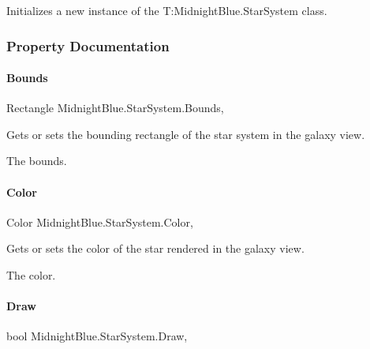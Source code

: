 Initializes a new instance of the T\+:\+Midnight\+Blue.\+Star\+System class. 



\subsubsection{Property Documentation}
\hypertarget{class_midnight_blue_1_1_star_system_ad850b29423ea1ae941e8d4f3e16b9283}{}\label{class_midnight_blue_1_1_star_system_ad850b29423ea1ae941e8d4f3e16b9283} 
\paragraph{\texorpdfstring{Bounds}{Bounds}}
{\footnotesize\ttfamily Rectangle Midnight\+Blue.\+Star\+System.\+Bounds\hspace{0.3cm}{\ttfamily [get]}, {\ttfamily [set]}}



Gets or sets the bounding rectangle of the star system in the galaxy view. 

The bounds.\hypertarget{class_midnight_blue_1_1_star_system_a23bc9f35df49f8411cb72bc3385dd90b}{}\label{class_midnight_blue_1_1_star_system_a23bc9f35df49f8411cb72bc3385dd90b} 
\paragraph{\texorpdfstring{Color}{Color}}
{\footnotesize\ttfamily Color Midnight\+Blue.\+Star\+System.\+Color\hspace{0.3cm}{\ttfamily [get]}, {\ttfamily [set]}}



Gets or sets the color of the star rendered in the galaxy view. 

The color.\hypertarget{class_midnight_blue_1_1_star_system_a9909c0e06a0fb6dc2dd657f00b61911a}{}\label{class_midnight_blue_1_1_star_system_a9909c0e06a0fb6dc2dd657f00b61911a} 
\paragraph{\texorpdfstring{Draw}{Draw}}
{\footnotesize\ttfamily bool Midnight\+Blue.\+Star\+System.\+Draw\hspace{0.3cm}{\ttfamily [get]}, {\ttfamily [set]}}



